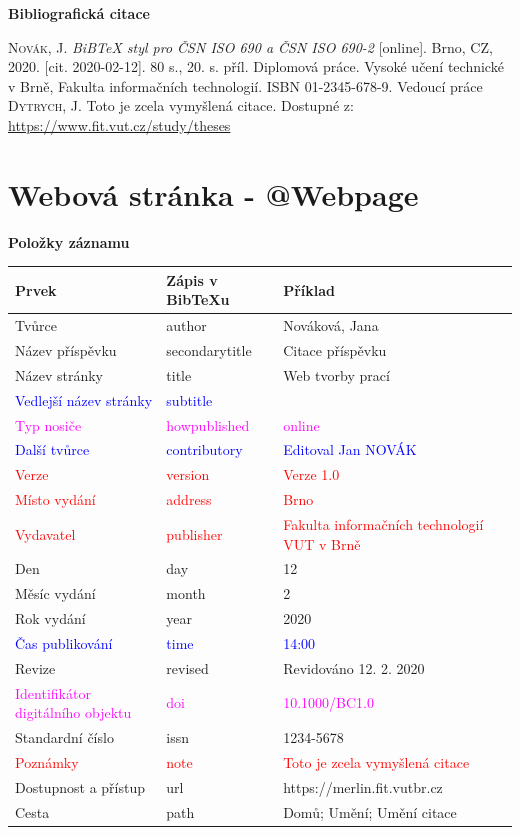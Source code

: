 \bigskip

\noindent \textbf{Bibliografická citace}

\medskip

\noindent \textsc{Novák}, J. \textit{BiBTeX styl pro ČSN ISO 690 a ČSN ISO 690-2} [online]. Brno, CZ, 2020. [cit. 2020-02-12]. 80 s., 20. s. příl. Diplomová práce. Vysoké učení technické v Brně, Fakulta informačních technologií. ISBN 01-2345-678-9. Vedoucí práce \textsc{Dytrych}, J. Toto je zcela vymyšlená citace. Dostupné z: \url{https://www.fit.vut.cz/study/theses}
\newpage
\section*{Webová stránka - @Webpage}
\label{pr-webpage}
\noindent \textbf{Položky záznamu}

\medskip

\begin{tabularx}{\linewidth}{X X X}
    Prvek & Zápis v BibTeXu & Příklad\\\hline
    Tvůrce & author & Nováková, Jana\\
    Název příspěvku & secondarytitle & Citace příspěvku\\
    Název stránky & title & Web tvorby prací\\
    \textcolor{blue}{Vedlejší název stránky}  &  \textcolor{blue}{subtitle} & \\
    \textcolor{magenta}{Typ nosiče} & \textcolor{magenta}{howpublished} & \textcolor{magenta}{online}\\
    \textcolor{blue}{Další tvůrce} & \textcolor{blue}{contributory} & \textcolor{blue}{Editoval Jan NOVÁK}\\
    \textcolor{red}{Verze} & \textcolor{red}{version} & \textcolor{red}{Verze 1.0}\\
    \textcolor{red}{Místo vydání} & \textcolor{red}{address} & \textcolor{red}{Brno}\\
    \textcolor{red}{Vydavatel} & \textcolor{red}{publisher} & \textcolor{red}{Fakulta informačních technologií VUT v Brně}\\
    Den & day & 12\\
    Měsíc vydání & month & 2\\
    Rok vydání & year & 2020\\
    \textcolor{blue}{Čas publikování} & \textcolor{blue}{time} & \textcolor{blue}{14:00}\\
    Revize & revised & Revidováno 12. 2. 2020\\
    \textcolor{magenta}{Identifikátor digitálního objektu} & \textcolor{magenta}{doi} & \textcolor{magenta}{10.1000/BC1.0}\\
    Standardní číslo & issn & 1234-5678\\
    \textcolor{red}{Poznámky} & \textcolor{red}{note} & \textcolor{red}{Toto je zcela vymyšlená citace}\\
    Dostupnost a přístup & url & https://merlin.fit.vutbr.cz\\
    Cesta & path & Domů; Umění; Umění citace
\end{tabularx}

